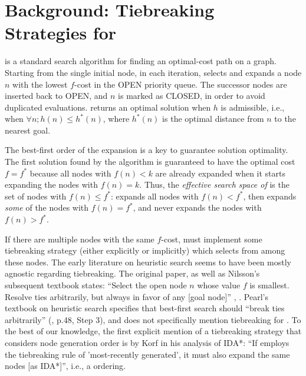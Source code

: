 \section{Background: Tiebreaking Strategies for \astar}

\label{sec:astar-background}

\astar is a standard search algorithm for finding an optimal-cost path
on a graph.
Starting from the single initial node, in each iteration, \astar
selects and expands a node $n$ with the lowest $f$-cost in the OPEN
priority queue. The successor nodes are inserted back to OPEN, and $n$
is marked as CLOSED, in order to avoid duplicated evaluations.
\astar returns an optimal solution when $h$ is admissible, i.e., when
$\forall n; h(n) \leq h^*(n)$, where $h^*(n)$ is the optimal distance from $n$ to
the nearest goal.

The best-first order of the expansion is a key to guarantee solution optimality. 
The first solution found by the algorithm is guaranteed to have the optimal cost $f=f^*$ because 
all nodes with $f(n) < k$ are already expanded when it starts expanding
the nodes with $f(n) = k$.
Thus, the \emph{effective search space of \astar} is the set of nodes with 
$f(n) \leq f^*$: \astar expands all nodes with $f(n) < f^*$, then
expands \emph{some} of the nodes with $f(n) = f^*$, and
never expands the nodes with $f(n) > f^*$.

If there are multiple nodes with the same $f$-cost, \astar
must implement some tiebreaking strategy (either
explicitly or implicitly) which selects from among these nodes.
The early literature on heuristic search seems to have been mostly agnostic regarding tiebreaking.
The original \astar paper, as well as Nilsson's subsequent textbook 
states: ``Select the open node $n$ whose value $f$
is smallest. Resolve ties arbitrarily, but always in favor of any [goal
node]'' \cite[p.102 Step 2]{hart1968formal}, \cite[p.69]{Nilsson71}.
Pearl's textbook on heuristic search specifies that best-first search should ``break ties arbitrarily'' (\citeyear{pearl1984heuristics}, p.48, Step 3), and does not specifically mention tiebreaking for \astar.
To the best of our knowledge, the first explicit mention of a tiebreaking strategy that considers node generation order is by Korf in his analysis of IDA*: ``If \astar employs the tiebreaking rule of 'most-recently generated', it must also expand the same nodes [as IDA*]'', i.e., a \lifo ordering.

